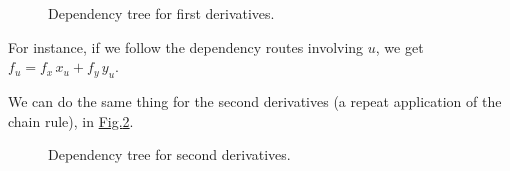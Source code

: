 \documentclass[letterpaper,10pt,english]{jupyterBook}
\begin{document}
\begin{figure}[htbp]
\centering
\capstart

\noindent{}
\caption{Dependency tree for first derivatives.}\label{\detokenize{VectorCalculus/partialdifferentiation:dependency1}}\end{figure}

\sphinxAtStartPar
For instance, if we follow the dependency routes involving \(u\), we get \(f_u = f_x\, x_u + f_y\, y_u\).

\sphinxAtStartPar
We can do the same thing for the second derivatives (a repeat application of the chain rule), in \hyperref[\detokenize{VectorCalculus/partialdifferentiation:dependency2}]{Fig.\@ \ref{\detokenize{VectorCalculus/partialdifferentiation:dependency2}}}.

\begin{figure}[htbp]
\centering
\capstart

\noindent{}
\caption{Dependency tree for second derivatives.}\label{\detokenize{VectorCalculus/partialdifferentiation:dependency2}}\end{figure}
\end{document}
